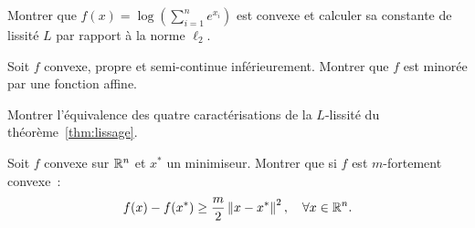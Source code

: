 \begin{exercice}[$\star\star$]
Montrer que $f(x) = \log\left(\sum_{i=1}^n e^{x_i}\right)$ est convexe et calculer
sa constante de lissit\'e $L$ par rapport \`a la norme $\ell_2$.
\end{exercice}

\begin{exercice}[$\star\star$]
Soit $f$ convexe, propre et semi-continue inf\'erieurement. Montrer que $f$ est
minor\'ee par une fonction affine.
\end{exercice}

\begin{exercice}[$\star\star\star$]
Montrer l'\'equivalence des quatre caract\'erisations de la $L$-lissit\'e du
th\'eor\`eme~\ref{thm:lissage}.
\end{exercice}

\begin{exercice}[$\star\star\star$]
Soit $f$ convexe sur $\mathbb{R}^n$ et $x^*$ un minimiseur. Montrer que si $f$ est
$m$-fortement convexe~:
\[
    f(x) - f(x^*) \geq \frac{m}{2}\left\| x - x^* \right\|^2, \quad \forall x \in \mathbb{R}^n.
\]
\end{exercice}
